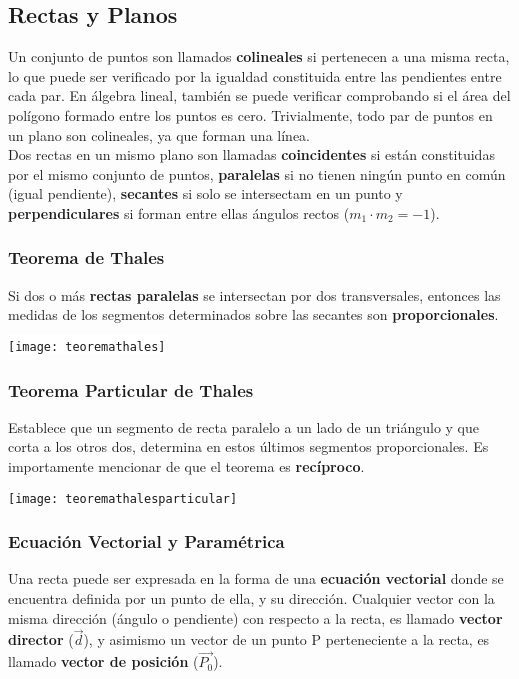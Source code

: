 \subsection{Rectas y Planos}
Un conjunto de puntos son llamados \textbf{colineales} si pertenecen a una misma recta, lo que puede ser verificado por la igualdad constituida entre las pendientes entre cada par. En álgebra lineal, también se puede verificar comprobando si el área del polígono formado entre los puntos es cero. Trivialmente, todo par de puntos en un plano son colineales, ya que forman una línea.\\

Dos rectas en un mismo plano son llamadas \textbf{coincidentes} si están constituidas por el mismo conjunto de puntos, \textbf{paralelas} si no tienen ningún punto en común (igual pendiente), \textbf{secantes} si solo se intersectam en un punto y \textbf{perpendiculares} si forman entre ellas ángulos rectos ($m_1 \cdot m_2 = -1$).\\

\subsubsection{Teorema de Thales}
Si dos o más \textbf{rectas paralelas} se intersectan por dos transversales, entonces las medidas de los segmentos determinados sobre las secantes son \textbf{proporcionales}.
\begin{center}
\colorbox{white}{\texttt{[image: teoremathales]}}
\end{center}
\subsubsection{Teorema Particular de Thales}
Establece que un segmento de recta paralelo a un lado de un triángulo y que corta a los otros dos, determina en estos últimos segmentos proporcionales. Es importamente mencionar de que el teorema es \textbf{recíproco}.
\begin{center}
    \texttt{[image: teoremathalesparticular]}
\end{center}
\subsubsection{Ecuación Vectorial y Paramétrica}
Una recta puede ser expresada en la forma de una \textbf{ecuación vectorial} donde se encuentra definida por un punto de ella, y su dirección. Cualquier vector con la misma dirección (ángulo o pendiente) con respecto a la recta, es llamado \textbf{vector director} ($\vec{d}$), y asimismo un vector de un punto P perteneciente a la recta, es llamado \textbf{vector de posición} ($\vec{P_0}$).\\

